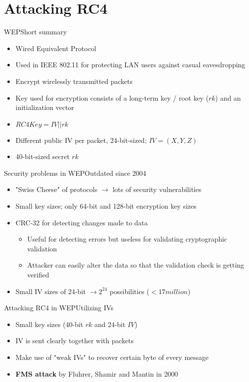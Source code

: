 \documentclass[
	aspectratio=169,	%
	onlytextwidth,		%
	t,					%
	]{beamer}
\begin{document}
\section{Attacking RC4}

\begin{frame}[fragile]{WEP}{Short summary}
	\begin{itemize}
		\item Wired Equivalent Protocol
		\item Used in IEEE 802.11 for protecting LAN users against casual eavesdropping
		\item Encrypt wirelessly transmitted packets
		\item Key used for encryption consists of a long-term key / root key ($rk$) and an initialization vector
		\item $RC4Key = IV||rk$
		\item Different public IV per packet, 24-bit-sized; $IV=(X,Y,Z)$
		\item 40-bit-sized secret $rk$
	\end{itemize}
\end{frame}

\begin{frame}[fragile]{Security problems in WEP}{Outdated since 2004}
	\begin{itemize}
		\item "Swiss Cheese" of protocols $\rightarrow$ lots of security vulnerabilities
		\item Small key sizes; only 64-bit and 128-bit encryption key sizes
		\item CRC-32 for detecting changes made to data
		\begin{itemize}
		\item Useful for detecting errors but useless for validating cryptographic validation
		\item Attacker can easily alter the data so that the validation check is getting verified
		\end{itemize}
		\item Small IV sizes of 24-bit $\rightarrow 2^{24}$ possibilities ($<17 million$)
	\end{itemize}
\end{frame}

\begin{frame}[fragile]{Attacking RC4 in WEP}{Utilizing IVs}
	\begin{itemize}
		\item Small key sizes (40-bit $rk$ and 24-bit $IV$)
		\item IV is sent clearly together with packets
		\item Make use of "weak IVs" to recover certain byte of every message
		\item \textbf{FMS attack} by Fluhrer, Shamir and Mantin in 2000
	\end{itemize}
\end{frame}
\end{document}
